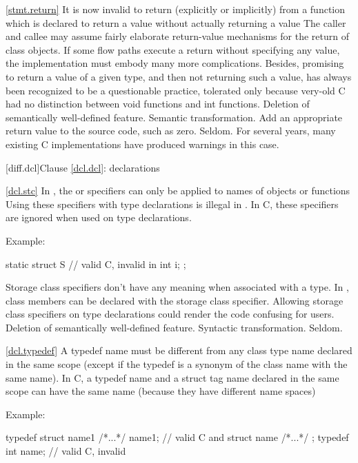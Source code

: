\ref{stmt.return}
\change It is now invalid to return (explicitly or implicitly) from a function which is
declared to return a value without actually returning a value
\rationale
The caller and callee may assume fairly elaborate
return-value mechanisms for the return of class objects.
If
some flow paths execute a return without specifying any value,
the implementation must embody many more complications.
Besides,
promising to return a value of a given type, and then not returning
such a value, has always been recognized to be a questionable
practice, tolerated only because very-old C had no distinction between
void  functions and  int  functions.
\effect
Deletion of semantically well-defined feature.
\difficulty
Semantic transformation.
Add an appropriate return value to the source code, such as zero.
\howwide
Seldom.
For several years, many existing C implementations have produced warnings in
this case.

[diff.dcl]{Clause \ref{dcl.dcl}: declarations}

\ref{dcl.stc}
\change In \Cpp, the  or  specifiers can only be applied to names of objects or functions
Using these specifiers with type declarations is illegal in \Cpp.
In C, these specifiers are ignored when used on type declarations.

Example:

\begin{codeblock}
static struct S {               // valid C, invalid in \Cpp
  int i;
};
\end{codeblock}

\rationale
Storage class specifiers don't have any meaning when associated
with a type.
In \Cpp, class members can be declared with the  storage
class specifier.
Allowing storage class specifiers on type
declarations could render the code confusing for users.
\effect
Deletion of semantically well-defined feature.
\difficulty
Syntactic transformation.
\howwide
Seldom.

\ref{dcl.typedef}
\change A \Cpp typedef name must be different from any class type name declared
in the same scope (except if the typedef is a synonym of the class name with the
same name). In C, a typedef name and a struct tag name declared in the same scope
can have the same name (because they have different name spaces)

Example:
\begin{codeblock}
typedef struct name1 { /*...*/ } name1;         // valid C and \Cpp
struct name { /*...*/ };
typedef int name;               // valid C, invalid \Cpp
\end{codeblock}

